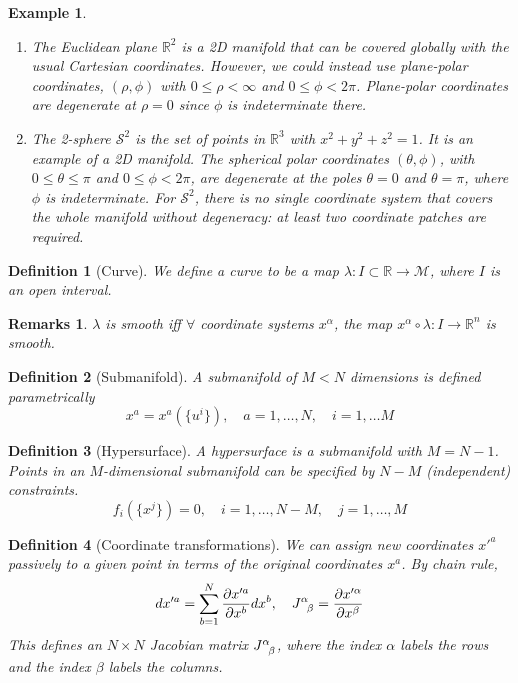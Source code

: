 \documentclass[a4paper]{article}
\newtheorem{eg}{Example}[section]
\newtheorem{remarks}{Remarks}[section]
\theoremstyle{new}
\newtheorem{defi}{Definition}[section]
\begin{document}
\begin{eg}\leavevmode
\begin{enumerate}
    \item The Euclidean plane $\mathbb{R}^2$ is a 2D manifold that can be covered globally with the usual Cartesian coordinates. However, we could instead use plane-polar coordinates, $(\rho, \phi)$ with $0\leq\rho<\infty$ and $0\leq\phi<2\pi$. Plane-polar coordinates are degenerate at $\rho= 0$ since $\phi$ is indeterminate there.
    \item The 2-sphere $\mathcal{S}^2$ is the set of points in $\mathbb{R}^3$ with $x^2+y^2+z^2 =1$. It is an example of a 2D manifold. The spherical polar coordinates $(\theta, \phi)$, with $0\leq\theta\leq\pi$ and $0\leq\phi < 2\pi$, are degenerate at the poles $\theta=0$ and $\theta = \pi$, where $\phi$ is indeterminate. For $\mathcal{S}^2$, there is no single coordinate system that covers the whole manifold without degeneracy: at least two coordinate patches are required.
\end{enumerate}
\end{eg}
\begin{defi}[Curve]
We define a curve to be a map $\lambda:I\subset\mathbb{R}\rightarrow\mathcal{M}$, where $I$ is an open interval. 
\end{defi}
\begin{remarks}
$\lambda$ is smooth iff $\forall$ coordinate systems $x^\alpha$, the map $x^\alpha\circ\lambda:I\rightarrow\mathbb{R}^n$ is smooth.
\end{remarks}
\begin{defi}[Submanifold]
A submanifold of $M<N$ dimensions is defined parametrically
$$x^a=x^a(\{u^i\}),\quad a=1,\dots,N,\quad i=1,\dots M$$
\end{defi}
\begin{defi}[Hypersurface]
A hypersurface is a submanifold with $M=N-1$. Points in an $M$-dimensional submanifold can be specified by $N − M$ (independent) constraints.
$$f_i(\{x^j\})=0,\quad i=1,\dots,N-M,\quad j=1,\dots,M$$
\end{defi}
\begin{defi}[Coordinate transformations]
We can assign new coordinates $x'^a$ passively to a given point in terms of the original coordinates $x^a$. By chain rule,
\begin{equation}
dx'^a=\sum_{b=1}^N\frac{\partial x'^a}{\partial x^b}dx^b,\quad \tensor*{J}{*_{}^{\alpha}_{\beta}}=\frac{\partial x'^\alpha}{\partial x^\beta}\label{Jacobian}
\end{equation}
This defines an $N\times N$ Jacobian matrix $\tensor*{J}{*_{}^{\alpha}_{\beta}}$, where the index $\alpha$ labels the rows and the index $\beta$ labels the columns.
\end{defi}
\end{document}
